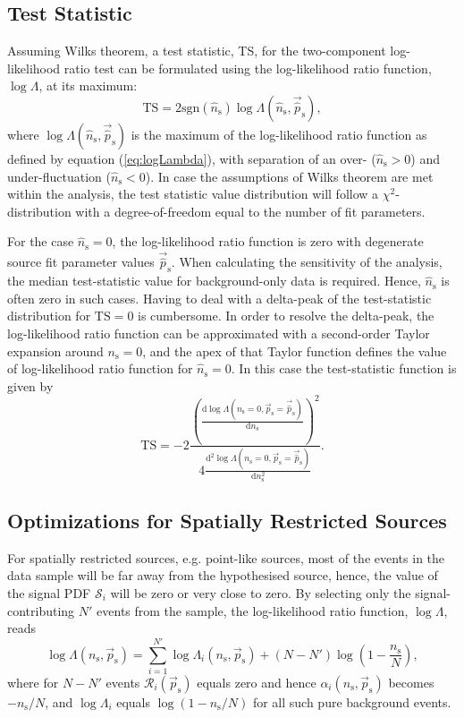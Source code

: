 \documentclass{article}
\newcommand{\ns}{n_{\mathrm{s}}}
\newcommand{\hatns}{\hat{n}_{\mathrm{s}}}
\newcommand{\ps}{\vec{p}_{\mathrm{s}}}
\newcommand{\hatps}{\vec{\hat{p}}_{\mathrm{s}}}
\begin{document}
\subsection{Test Statistic}
\label{sec:teststatistic}

Assuming Wilks theorem, a test statistic, TS, for the two-component log-likelihood
ratio test can be formulated using the log-likelihood ratio function, $\log\Lambda$,
at its maximum:
\begin{equation}
 \mathrm{TS} = 2\mathrm{sgn}(\hatns) \log \Lambda(\hatns, \hatps),
 \label{eq:TS}
\end{equation}
where $\log \Lambda(\hatns,\hatps)$ is the maximum of the
log-likelihood ratio function as defined by equation (\ref{eq:logLambda}),
with separation of an over- ($\hatns > 0$) and under-fluctuation ($\hatns < 0$).
In case the assumptions of Wilks theorem are met within the analysis, the test
statistic value distribution will follow a $\chi^2$-distribution with
a degree-of-freedom equal to the number of fit parameters.

For the case $\hatns=0$, the log-likelihood ratio function is zero
with degenerate source fit parameter values $\hatps$.
When calculating the sensitivity of the analysis, the median test-statistic value
for background-only data is required. Hence, $\hatns$ is often zero in such cases.
Having to deal with a delta-peak of the test-statistic distribution
for $\mathrm{TS}=0$ is cumbersome. In order to resolve the delta-peak, the
log-likelihood ratio function can be approximated with a second-order Taylor
expansion around $\ns=0$, and the apex of that Taylor function defines the value of
log-likelihood ratio function for $\hatns=0$. In this case the test-statistic
function is given by
\begin{equation}
 \mathrm{TS} = -2\frac{\left(\frac{\mathrm{d}\log\Lambda(\ns=0,\ps=\hatps)}{\mathrm{d}\ns}\right)^2}{4\frac{\mathrm{d}^2\log\Lambda(\ns=0,\ps=\hatps)}{\mathrm{d}\ns^2}}.
\end{equation}

\subsection{Optimizations for Spatially Restricted Sources}

For spatially restricted sources, e.g. point-like sources, most of the events in
the data sample will be far away from the hypothesised source, hence, the value of the
signal PDF $\mathcal{S}_i$ will be zero or very close to zero. By selecting only
the signal-contributing $N'$ events from the sample, the log-likelihood ratio
function, $\log \Lambda$, reads
\begin{equation}
 \log \Lambda(\ns,\ps) = \sum_{i=1}^{N'} \log \Lambda_i(\ns,\ps) + (N - N')\log(1 - \frac{\ns}{N}),
 \label{eq:logLambdaOfXOptimized}
\end{equation}
where for $N-N'$ events $\mathcal{R}_i(\ps)$ equals zero and hence
$\alpha_i(\ns,\ps)$ becomes $-\ns/N$, and $\log \Lambda_i$ equals $\log(1 - \ns/N)$
for all such pure background events.
\end{document}
